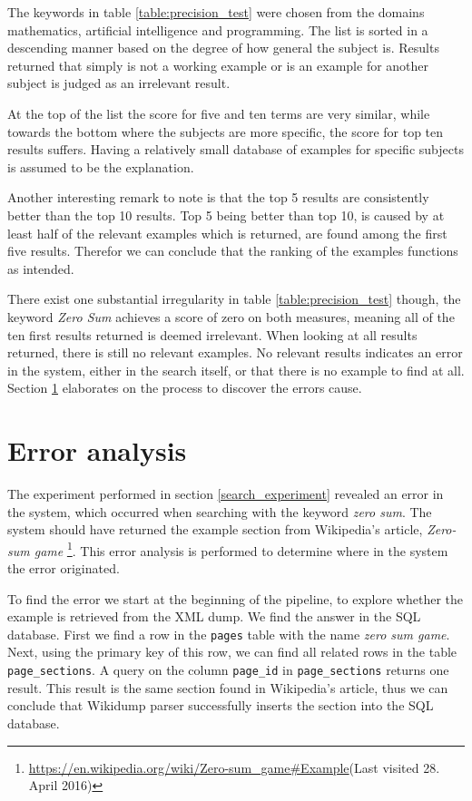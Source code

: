 The keywords in table \ref{table:precision_test} were chosen from the domains mathematics, artificial intelligence and programming. The list is sorted in a descending manner based on the degree of how general the subject is.
Results returned that simply is not a working example or is an example for another subject is judged as an irrelevant result.

At the top of the list the score for five and ten terms are very similar, while towards the bottom where the subjects are more specific, the score for top ten results suffers. Having a relatively small database of examples for specific subjects is assumed to be the explanation.

Another interesting remark to note is that the top 5 results are consistently better than the top 10 results. Top 5 being better than top 10, is caused by at least half of the relevant examples which is returned, are found among the first five results. Therefor we can conclude that the ranking of the examples functions as intended. 

There exist one substantial irregularity in table \ref{table:precision_test} though, the keyword \textit{Zero Sum} achieves a score of zero on both measures, meaning all of the ten first results returned is deemed irrelevant. When looking at all results returned, there is still no relevant examples. No relevant results indicates an error in the system, either in the search itself, or that there is no example to find at all. Section \ref{err_analysis} elaborates on the process to discover the errors cause.

\section{Error analysis} \label{err_analysis}

The experiment performed in section \ref{search_experiment} revealed an error in the system, which occurred when searching with the keyword \textit{zero sum}. The system should have returned the example section from Wikipedia's article, \textit{Zero-sum game} \footnote{\url{https://en.wikipedia.org/wiki/Zero-sum\_game\#Example}(Last visited 28. April 2016)}. This error analysis is performed to determine where in the system the error originated. 

To find the error we start at the beginning of the pipeline, to explore whether the example is retrieved from the XML dump. We find the answer in the SQL database. First we find a row in the \texttt{pages} table with the name \textit{zero sum game}. Next, using the primary key of this row, we can find all related rows in the table \texttt{page\_sections}. A query on the column \texttt{page\_id} in \texttt{page\_sections} returns one result. This result is the same section found in Wikipedia's article, thus we can conclude that Wikidump parser successfully inserts the section into the SQL database.

